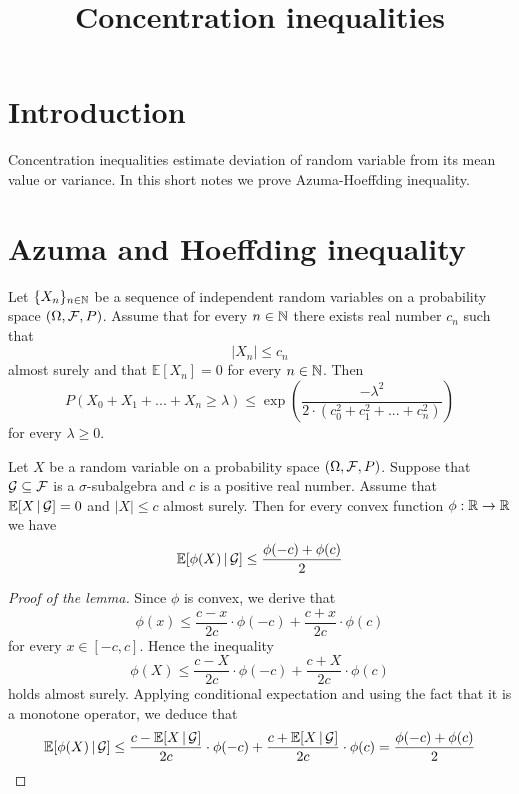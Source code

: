 



\title{Concentration inequalities}
\date{}
\maketitle

\section{Introduction}
\noindent
Concentration inequalities estimate deviation of random variable from its mean value or variance. In this short notes we prove Azuma-Hoeffding inequality. 

\section{Azuma and Hoeffding inequality}

\begin{theorem}\label{theorem:Azuma'ainequality}
Let $\{X_n\}_{n\in {\mathbb N}}$ be a sequence of independent random variables on a probability space $\left(\Omega, {\mathcal F},P\right)$. Assume that for every $n\in {\mathbb N}$ there exists real number $c_n$ such that 
$$|X_n|\leq c_n$$
almost surely and that $\mathbb{E}[X_n]=0$ for every $n\in {\mathbb N}$. Then 
$$P\left(X_0+X_1+...+X_n\geq \lambda\right)\leq \exp\left(\frac{-\lambda^2}{2\cdot \left(c_0^2+c_1^2+...+c^2_n\right)}\right)$$
for every $\lambda \geq 0$.
\end{theorem}

\begin{lemma}\label{lemma:betterJensen}
Let $X$ be a random variable on a probability space $\left(\Omega, {\mathcal F}, P\right)$. Suppose that ${\mathcal G}\subseteq {\mathcal F}$ is a $\sigma$-subalgebra and $c$ is a positive real number. Assume that ${\mathbb E}[X\,|\,{\mathcal G}]=0$ and $|X|\leq c$ almost surely. Then for every convex function $\phi:{\mathbb R}\rightarrow {\mathbb R}$ we have
$${\mathbb E} [\phi(X)\,|\,{\mathcal G}]\leq \frac{\phi(-c)+\phi(c)}{2}$$
\end{lemma}
\begin{proof}[Proof of the lemma]
Since $\phi$ is convex, we derive that
$$\phi(x) \leq \frac{c-x}{2c}\cdot \phi(-c)+\frac{c+x}{2c}\cdot \phi(c)$$
for every $x\in [-c,c]$. Hence the inequality
$$\phi(X)\leq \frac{c-X}{2c}\cdot \phi(-c)+\frac{c+X}{2c}\cdot \phi(c)$$
holds almost surely. Applying conditional expectation and using the fact that it is a monotone operator, we deduce that 
$${\mathbb E} [\phi(X)\,|\,{\mathcal G}] \leq \frac{c-{\mathbb E}[X\,|\,{\mathcal G}]}{2c}\cdot \phi(-c)+\frac{c+{\mathbb E}[X\,|\,{\mathcal G}]}{2c}\cdot \phi(c)=\frac{\phi(-c)+\phi(c)}{2}$$
\end{proof}


